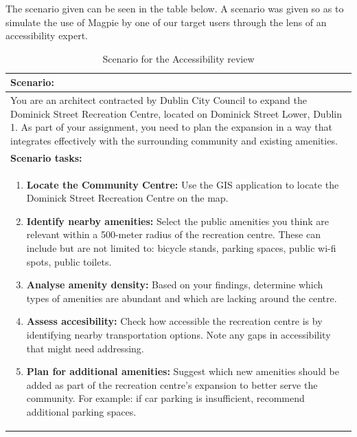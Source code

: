 The scenario given can be seen in the table below. A scenario was given so as to
simulate the use of Magpie by one of our target users through the lens of an
accessibility expert.

\begin{table}[h!]
    \centering
    \caption{Scenario for the Accessibility review}
    \begin{tabular}{|p{}|}
        \hline
        \textbf{Scenario:}                                                                                                                                                                                                                                                                                         \\
        \hline
        You are an architect contracted by Dublin City Council to expand the Dominick Street Recreation Centre, located on Dominick Street Lower, Dublin 1. As part of your assignment, you need to plan the expansion in a way that integrates effectively with the surrounding community and existing amenities. \\
        \hline
        \textbf{Scenario tasks:}                                                                                                                                                                                                                                                                                   \\
        \hline
        \begin{enumerate}
            \item \textbf{Locate the Community Centre:} Use the GIS application
            to locate the Dominick Street Recreation Centre on the map.
            \item \textbf{Identify nearby amenities:} Select the public
            amenities you think are relevant within a 500-meter radius of the
            recreation centre. These can include but are not limited to: bicycle
            stands, parking spaces, public wi-fi spots, public toilets.
            \item \textbf{Analyse amenity density:} Based on your findings,
            determine which types of amenities are abundant and which are
            lacking around the centre.
            \item \textbf{Assess accesibility:} Check how accessible the
            recreation centre is by identifying nearby transportation options.
            Note any gaps in accessibility that might need addressing.
            \item \textbf{Plan for additional amenities:} Suggest which new
            amenities should be added as part of the recreation centre's expansion
            to better serve the community. For example: if car parking is
            insufficient, recommend additional parking spaces.
        \end{enumerate}                                             \\
        \hline
    \end{tabular}
\end{table}

